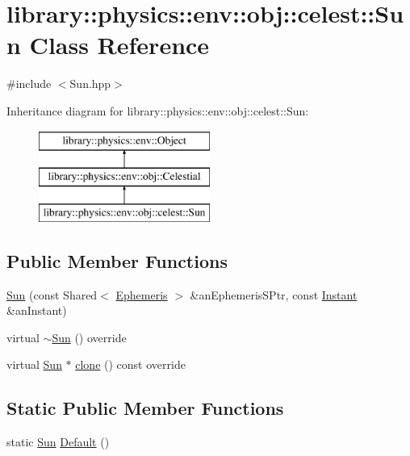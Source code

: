 \hypertarget{classlibrary_1_1physics_1_1env_1_1obj_1_1celest_1_1_sun}{}\section{library\+:\+:physics\+:\+:env\+:\+:obj\+:\+:celest\+:\+:Sun Class Reference}
\label{classlibrary_1_1physics_1_1env_1_1obj_1_1celest_1_1_sun}


{\ttfamily \#include $<$Sun.\+hpp$>$}

Inheritance diagram for library\+:\+:physics\+:\+:env\+:\+:obj\+:\+:celest\+:\+:Sun\+:\begin{figure}[H]
\begin{center}
\leavevmode
\includegraphics[height=3.000000cm]{classlibrary_1_1physics_1_1env_1_1obj_1_1celest_1_1_sun}
\end{center}
\end{figure}
\subsection*{Public Member Functions}
\begin{DoxyCompactItemize}
\item 
\hyperlink{classlibrary_1_1physics_1_1env_1_1obj_1_1celest_1_1_sun_af7d255396b52aa8c9fa5379ca01d08c8}{Sun} (const Shared$<$ \hyperlink{classlibrary_1_1physics_1_1env_1_1_ephemeris}{Ephemeris} $>$ \&an\+Ephemeris\+S\+Ptr, const \hyperlink{classlibrary_1_1physics_1_1time_1_1_instant}{Instant} \&an\+Instant)
\item 
virtual \hyperlink{classlibrary_1_1physics_1_1env_1_1obj_1_1celest_1_1_sun_a34a14e47bbbc26292809dba9c8d1ece8}{$\sim$\+Sun} () override
\item 
virtual \hyperlink{classlibrary_1_1physics_1_1env_1_1obj_1_1celest_1_1_sun}{Sun} $\ast$ \hyperlink{classlibrary_1_1physics_1_1env_1_1obj_1_1celest_1_1_sun_a79fa2d336dad399c3d933b0f5a2f9427}{clone} () const override
\end{DoxyCompactItemize}
\subsection*{Static Public Member Functions}
\begin{DoxyCompactItemize}
\item 
static \hyperlink{classlibrary_1_1physics_1_1env_1_1obj_1_1celest_1_1_sun}{Sun} \hyperlink{classlibrary_1_1physics_1_1env_1_1obj_1_1celest_1_1_sun_a4854f1ce74cbabb804d0084b71e76bcf}{Default} ()
\end{DoxyCompactItemize}
